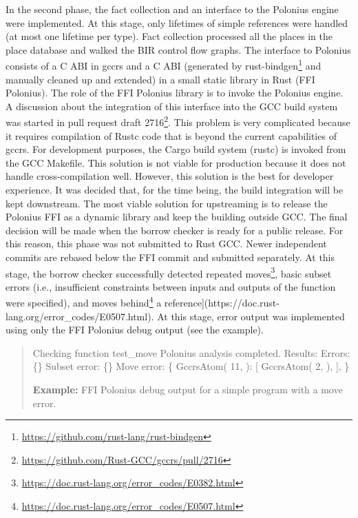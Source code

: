 \documentclass[
  11pt,
  twoside,symmetric]{report}
\newenvironment{Shaded}{}{}
\newcommand{\DecValTok}[1]{#1}
\newcommand{\NormalTok}[1]{#1}
\newcommand{\OperatorTok}[1]{#1}
\DeclareRobustCommand{\href}[2]{#2\footnote{\url{#1}}}
\begin{document}
In the second phase, the fact collection and an interface to the
Polonius engine were implemented. At this stage, only lifetimes of
simple references were handled (at most one lifetime per type). Fact
collection processed all the places in the place database and walked the
BIR control flow graphs. The interface to Polonius consists of a C ABI
in gccrs and a C ABI (generated by
\href{https://github.com/rust-lang/rust-bindgen}{rust-bindgen} and
manually cleaned up and extended) in a small static library in Rust (FFI
Polonius). The role of the FFI Polonius library is to invoke the
Polonius engine. A discussion about the integration of this interface
into the GCC build system was started in
\href{https://github.com/Rust-GCC/gccrs/pull/2716}{pull request draft
2716}. This problem is very complicated because it requires compilation
of Rustc code that is beyond the current capabilities of gccrs. For
development purposes, the Cargo build system (rustc) is invoked from the
GCC Makefile. This solution is not viable for production because it does
not handle cross-compilation well. However, this solution is the best
for developer experience. It was decided that, for the time being, the
build integration will be kept downstream. The most viable solution for
upstreaming is to release the Polonius FFI as a dynamic library and keep
the building outside GCC. The final decision will be made when the
borrow checker is ready for a public release. For this reason, this
phase was not submitted to Rust GCC. Newer independent commits are
rebased below the FFI commit and submitted separately. At this stage,
the borrow checker successfully detected
\href{https://doc.rust-lang.org/error_codes/E0382.html}{repeated moves},
basic subset errors (i.e., insufficient constraints between inputs and
outputs of the function were specified), and
\href{https://doc.rust-lang.org/error_codes/E0507.html}{moves behind} a
reference{]}(https://doc.rust-lang.org/error\_codes/E0507.html). At this
stage, error output was implemented using only the FFI Polonius debug
output (see the example).

\begin{quote}
\begin{Shaded}
\begin{Highlighting}[]
\NormalTok{[}\DecValTok{34}\OperatorTok{/}\DecValTok{35}\NormalTok{] Checking function test\_move}
\NormalTok{Polonius analysis completed}\OperatorTok{.}\NormalTok{ Results}\OperatorTok{:}
\NormalTok{Errors}\OperatorTok{:} \OperatorTok{\{\}}
\NormalTok{Subset error}\OperatorTok{:} \OperatorTok{\{\}}
\NormalTok{Move error}\OperatorTok{:} \OperatorTok{\{}
\NormalTok{   GccrsAtom(}
       \DecValTok{11}\OperatorTok{,}
\NormalTok{   )}\OperatorTok{:}\NormalTok{ [}
\NormalTok{       GccrsAtom(}
           \DecValTok{2}\OperatorTok{,}
\NormalTok{       )}\OperatorTok{,}
\NormalTok{   ]}\OperatorTok{,}
\OperatorTok{\}}
\end{Highlighting}
\end{Shaded}

\textbf{Example:} FFI Polonius debug output for a simple program with a
move error.
\end{quote}
\end{document}
